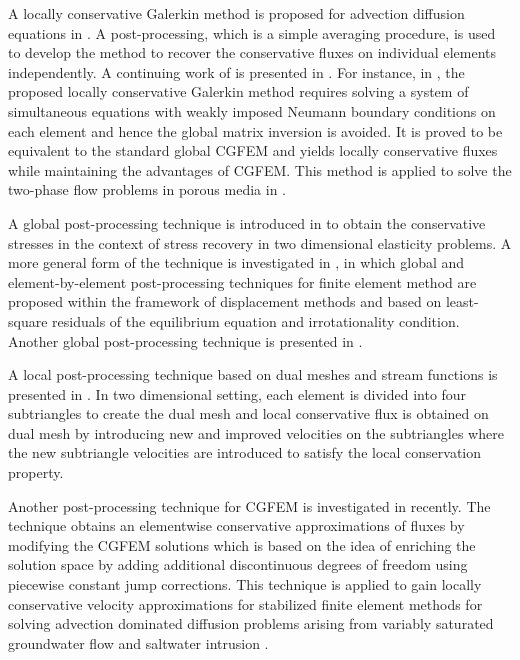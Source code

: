 \documentclass[times]{nlaauth}
\numberwithin{equation}{section}
\begin{document}
A locally conservative Galerkin method is proposed for advection diffusion equations in \cite{nithiarasu2004simple}. A post-processing, which is a simple averaging procedure, is used to develop the method to recover the conservative fluxes on individual elements independently. A continuing work of \cite{nithiarasu2004simple} is presented in \cite{thomas2008element, thomas2008locally}. For instance, in \cite{thomas2008element}, the proposed locally conservative Galerkin method requires solving a system of simultaneous equations with weakly imposed Neumann boundary conditions on each element and hence the global matrix inversion is avoided. It is proved to be equivalent to the standard global CGFEM and yields locally conservative fluxes while maintaining the advantages of CGFEM. This method is applied to solve the two-phase flow problems in porous media in \cite{zhang2013locally}.

A global post-processing technique is introduced in \cite{toledo1989mixed} to obtain the conservative stresses in the context of stress recovery in two dimensional elasticity problems. A more general form of the technique is investigated in \cite{loula1995higher}, in which global and element-by-element post-processing techniques for finite element method are proposed within the framework of displacement methods and based on least-square residuals of the equilibrium equation and irrotationality condition. 
Another global post-processing technique is presented in \cite{srivastava1992three}. 

A local post-processing technique based on dual meshes and stream functions is presented in \cite{cordes1992continuous}. In two dimensional setting, each element is divided into four subtriangles to create the dual mesh and local conservative flux is obtained on dual mesh by introducing new and improved velocities on the subtriangles where the new subtriangle velocities are introduced to satisfy the local conservation property.

Another post-processing technique for CGFEM is investigated in \cite{larson2004conservative} recently. The technique obtains an elementwise conservative approximations of fluxes by modifying the CGFEM solutions which is based on the idea of enriching the solution space by adding additional discontinuous degrees of freedom using piecewise constant jump corrections. This technique is applied to gain locally conservative velocity approximations for stabilized finite element methods for solving advection dominated diffusion problems arising from variably saturated groundwater flow \cite{kees2008locally} and saltwater intrusion \cite{povich2013finite}. 
\end{document}
